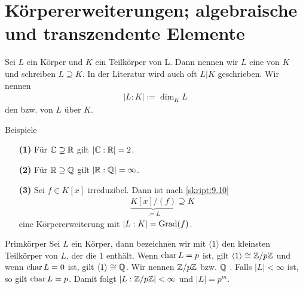 \section{Körpererweiterungen; algebraische und transzendente Elemente}

\begin{df}\label{skript:13.1}
	Sei $L$ ein Körper und $K$ ein Teilkörper von L.
	Dann nennen wir $L$ eine  von $K$
	und schreiben $L \supseteq K$.
	In der Literatur wird auch oft $L | K $ geschrieben.
	Wir nennen 
	\begin{align*}
	| L : K | := \dim_K L
	\end{align*}
	den  bzw.  von $L$ über $K$.
\end{df}

\begin{genericdf}{Beispiele}\label{skript:13.2}\
	\begin{enumerate}
		\item[\textbf{(1)}]
		Für $\mathbb{C} \supseteq \mathbb{R}$ gilt $| \mathbb{C} : \mathbb{R} | = 2$.
		
		\item[\textbf{(2)}]
		Für $\mathbb{R} \supseteq \mathbb{Q}$ gilt $|\mathbb{R} : \mathbb{Q}| = \infty$.
		
		\item[\textbf{(3)}]
		Sei $f \in K[x]$ irreduzibel.
		Dann ist nach \ref{skript:9.10}
		\begin{align*}
		\underbrace{K[x] / (f) }_{:= L} \supseteq K
		\end{align*}
		eine Körpererweiterung mit $| L : K | = \operatorname{Grad}(f)$.
	\end{enumerate}
\end{genericdf}

\begin{genericdf}{Primkörper}\label{skript:13.3}
	Sei $L$ ein Körper,
	dann bezeichnen wir mit $\langle 1 \rangle$ den kleinsten Teilkörper von $L$,
	der die $1$ enthält.
	Wenn $\operatorname{char} L = p$ ist, gilt $\langle 1 \rangle \cong \mathbb{Z} / p \mathbb{Z}$
	und wenn $\operatorname{char} L = 0 $ ist, gilt $\langle 1 \rangle \cong  \mathbb{Q}$.
	Wir nennen $\mathbb{Z} / p \mathbb{Z}$ bzw. $\mathbb{Q}$ .
	Falls $|L | < \infty$ ist, so gilt $\operatorname{char} L = p$.
	Damit folgt $| L : \mathbb{Z} / p \mathbb{Z} | < \infty$ und $|L | = p^m$.
\end{genericdf}

